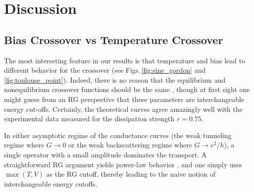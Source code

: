 \documentclass[aps,prb,reprint,floatfix,superscriptaddress,amssymb,amsmath]{revtex4-2}
\begin{document}
\section{Discussion}\label{sec:Discussion}

\subsection{Bias Crossover vs Temperature Crossover}
\label{sec:DiffCrossover}

The most interesting feature in our results is that temperature and bias lead to different behavior for the crossover (see Figs.\,\ref{fig:sine_gordon} and \ref{fig:toulouse_point}). 
Indeed, there is no reason that the equilibrium and nonequilibrium crossover functions should be the same 
\cite{KaneFisherPRB92,*KaneFisherPRB92a, AristovWoelfle09, AnthorePierrePRX18}, though at first sight one might guess from an RG perspective that these parameters are interchangeable energy cut-offs. 
Certainly, the theoretical curves agree amazingly well with the experimental data measured for the dissipation strength $r\!=\!0.75$. 

In either asymptotic regime of the conductance curves (the  weak tunneling regime where $G \!\to\! 0$ or the weak backscattering regime where $G \!\to\! e^2/h$), a single operator with a small amplitude dominates the transport. A straightforward RG argument yields power-law behavior \cite{KaneFisherPRB92}, and one simply uses $\max(T,V)$ as the RG cutoff, thereby leading to the naive notion of interchangeable energy cutoffs.  
\end{document}
